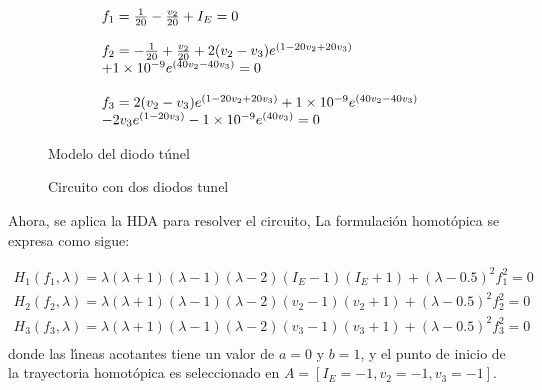 \documentclass[conference,letterpaper,onecolumn]{IEEEtran}
\begin{document}
{\begin{displaymath}
\begin{array}{l}
f_1=  {1 \over 20}-{v_2 \over 20}+I_E =0\\ \\
f_2=  -{1 \over 20}+{v_2 \over 20}+2(v_2-v_3)e^{(1-20v_2+20v_3)} \\+1\times 10^{-9}e^{(40v_2-40v_3)} =0 \\\\
f_3=  2(v_2-v_3)e^{(1-20v_2+20v_3)}+1\times 10^{-9}e^{(40v_2-40v_3)} \\ 
-2v_3e^{(1-20v_3)}-1\times 10^{-9} e^{(40v_3)} =0
\end{array}
\end{displaymath}

\begin{figure}[hbtp]
\centerline{
\epsfxsize=55mm
}
\caption{Modelo del diodo t\'unel}
\label{tunelmod}
\end{figure}

\begin{figure}[hbtp]
\centerline{
\epsfxsize=70mm 
}
\caption{Circuito con dos diodos tunel}
\label{2tunel}  
\end{figure}









Ahora, se aplica la  HDA para resolver el circuito,
La formulaci\'on homot\'opica se expresa como sigue:

\begin{displaymath}
\begin{array}{c}
H_1(f_1,\lambda)=\lambda(\lambda+1)(\lambda-1)(\lambda-2)(I_E-1)(I_E+1)+(\lambda-0.5)^2 f_1^2=0\\
H_2(f_2,\lambda)=\lambda(\lambda+1)(\lambda-1)(\lambda-2)(v_2-1)(v_2+1)+(\lambda-0.5)^2 f_2^2=0\\
H_3(f_3,\lambda)=\lambda(\lambda+1)(\lambda-1)(\lambda-2)(v_3-1)(v_3+1)+(\lambda-0.5)^2 f_3^2=0\\
\end{array}
\end{displaymath}
donde las l\'{\i}neas acotantes tiene un valor de $a=0$ y $b=1$, y el punto
de inicio de la trayectoria homot\'opica es seleccionado en $A=[I_E=-1,v_2=-1,v_3=-1]$.


}
\end{document}
